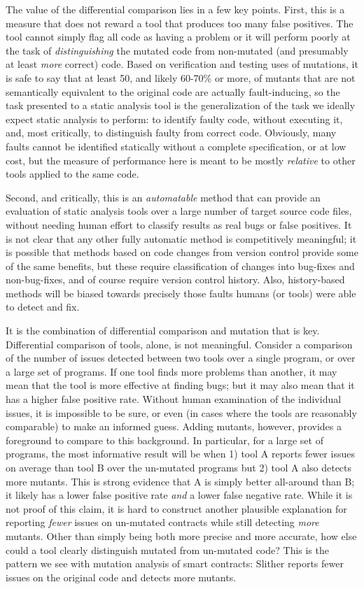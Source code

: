 \documentclass{article}
\begin{document}
The value of the differential comparison lies in a few key points.  First, this is a measure that does not reward a tool that produces too many false positives.  The tool cannot simply flag all code as having a problem or it will perform poorly at the task of \emph{distinguishing} the mutated code from non-mutated (and presumably at least \emph{more} correct) code.  Based on verification and testing uses of mutations, it is safe to say that at least 50, and likely 60-70\% or more, of mutants that are not semantically equivalent to the original code are actually fault-inducing, so the task presented to a static analysis tool is the generalization of the task we ideally expect static analysis to perform:  to identify faulty code, without executing it, and, most critically, to distinguish faulty from correct code.  Obviously, many faults cannot be identified statically without a complete specification, or at low cost, but the measure of performance here is meant to be mostly \emph{relative} to other tools applied to the same code.

Second, and critically, this is an \emph{automatable} method that can provide an evaluation of static analysis tools over a large number of target source code files, without needing human effort to classify results as real bugs or false positives.  It is not clear that any other fully automatic method is competitively meaningful; it is possible that methods based on code changes from version control provide some of the same benefits, but these require classification of changes into bug-fixes and non-bug-fixes, and of course require version control history.  Also, history-based methods will be biased towards precisely those faults humans (or tools) were able to detect and fix.

It is the combination of differential comparison and mutation that is key.  Differential comparison of tools, alone, is not meaningful.  Consider a comparison of the number of issues detected between two tools over a single program, or over a large set of programs.  If one tool finds more problems than another, it may mean that the tool is more effective at finding bugs; but it may also mean that it has a higher false positive rate.  Without human examination of the individual issues, it is impossible to be sure, or even (in cases where the tools are reasonably comparable) to make an informed guess.  Adding mutants, however, provides a foreground to compare to this background.  In particular, for a large set of programs, the most informative result will be when 1) tool A reports fewer issues on average than tool B over the un-mutated programs but 2) tool A also detects more mutants.  This is strong evidence that A is simply better all-around than B; it likely has a lower false positive rate \emph{and} a lower false negative rate.  While it is not proof of this claim, it is hard to construct another plausible explanation for reporting \emph{fewer} issues on un-mutated contracts while still detecting \emph{more} mutants.  Other than simply being both more precise and more accurate, how else could a tool clearly distinguish mutated from un-mutated code?
This is the pattern we see with mutation analysis of smart contracts:  Slither reports fewer issues on the original code and detects more mutants.
\end{document}
